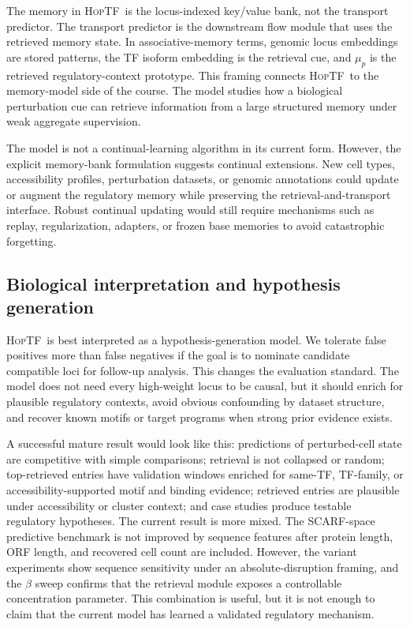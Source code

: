 \documentclass[11pt]{article}
\newcommand{\hoptf}{\textsc{HopTF}}
\newcommand{\scarf}{\textsc{SCARF}}
\begin{document}
The memory in \hoptf\ is the locus-indexed key/value bank, not the transport predictor. The transport predictor is the downstream flow module that uses the retrieved memory state. In associative-memory terms, genomic locus embeddings are stored patterns, the TF isoform embedding is the retrieval cue, and \(\mu_p\) is the retrieved regulatory-context prototype. This framing connects \hoptf\ to the memory-model side of the course. The model studies how a biological perturbation cue can retrieve information from a large structured memory under weak aggregate supervision.

The model is not a continual-learning algorithm in its current form. However, the explicit memory-bank formulation suggests continual extensions. New cell types, accessibility profiles, perturbation datasets, or genomic annotations could update or augment the regulatory memory while preserving the retrieval-and-transport interface. Robust continual updating would still require mechanisms such as replay, regularization, adapters, or frozen base memories to avoid catastrophic forgetting.

\subsection{Biological interpretation and hypothesis generation}

\hoptf\ is best interpreted as a hypothesis-generation model. We tolerate false positives more than false negatives if the goal is to nominate candidate compatible loci for follow-up analysis. This changes the evaluation standard. The model does not need every high-weight locus to be causal, but it should enrich for plausible regulatory contexts, avoid obvious confounding by dataset structure, and recover known motifs or target programs when strong prior evidence exists.

A successful mature result would look like this: predictions of perturbed-cell state are competitive with simple comparisons; retrieval is not collapsed or random; top-retrieved entries have validation windows enriched for same-TF, TF-family, or accessibility-supported motif and binding evidence; retrieved entries are plausible under accessibility or cluster context; and case studies produce testable regulatory hypotheses. The current result is more mixed. The \scarf-space predictive benchmark is not improved by sequence features after protein length, ORF length, and recovered cell count are included. However, the variant experiments show sequence sensitivity under an absolute-disruption framing, and the \(\beta\) sweep confirms that the retrieval module exposes a controllable concentration parameter. This combination is useful, but it is not enough to claim that the current model has learned a validated regulatory mechanism.
\end{document}
